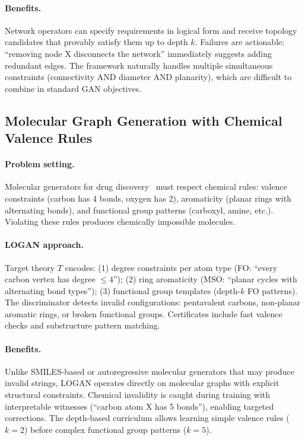 \documentclass{article}
\begin{document}
\paragraph{Benefits.}
Network operators can specify requirements in logical form and receive topology candidates that provably satisfy them up to depth $k$. Failures are actionable: ``removing node X disconnects the network'' immediately suggests adding redundant edges. The framework naturally handles multiple simultaneous constraints (connectivity AND diameter AND planarity), which are difficult to combine in standard GAN objectives.

\subsection{Molecular Graph Generation with Chemical Valence Rules}

\paragraph{Problem setting.}
Molecular generators for drug discovery~\cite{you2018graphrnn,jin2018junction} must respect chemical rules: valence constraints (carbon has 4 bonds, oxygen has 2), aromaticity (planar rings with alternating bonds), and functional group patterns (carboxyl, amine, etc.). Violating these rules produces chemically impossible molecules.

\paragraph{LOGAN approach.}
Target theory $T$ encodes: (1) degree constraints per atom type (FO: ``every carbon vertex has degree $\le 4$''); (2) ring aromaticity (MSO: ``planar cycles with alternating bond types''); (3) functional group templates (depth-$k$ FO patterns). The discriminator detects invalid configurations: pentavalent carbons, non-planar aromatic rings, or broken functional groups. Certificates include fast valence checks and substructure pattern matching.

\paragraph{Benefits.}
Unlike SMILES-based or autoregressive molecular generators that may produce invalid strings, LOGAN operates directly on molecular graphs with explicit structural constraints. Chemical invalidity is caught during training with interpretable witnesses (``carbon atom X has 5 bonds''), enabling targeted corrections. The depth-based curriculum allows learning simple valence rules ($k=2$) before complex functional group patterns ($k=5$).
\end{document}
